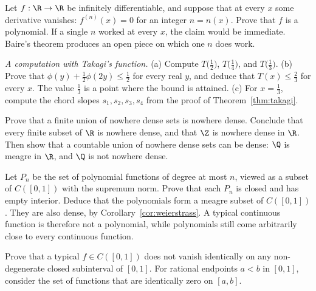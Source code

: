 \begin{exercise}[$\star\star\star$]\label{ex:polynomial}
Let $f:\R\to\R$ be infinitely differentiable, and suppose that at every $x$ some derivative vanishes: $f^{(n)}(x)=0$ for an integer $n=n(x)$. Prove that $f$ is a polynomial. If a single $n$ worked at every $x$, the claim would be immediate. Baire's theorem produces an open piece on which one $n$ does work.
\end{exercise}

\begin{exercise}[$\star$]\label{ex:takagivalues}
\emph{A computation with Takagi's function.} (a) Compute $T\bigl(\frac12\bigr)$, $T\bigl(\frac14\bigr)$, and $T\bigl(\frac13\bigr)$. (b) Prove that $\phi(y)+\frac12\phi(2y)\le\frac12$ for every real $y$, and deduce that $T(x)\le\frac23$ for every $x$. The value $\frac13$ is a point where the bound is attained. (c) For $x=\frac13$, compute the chord slopes $s_1,s_2,s_3,s_4$ from the proof of Theorem~\ref{thm:takagi}.
\end{exercise}

\begin{exercise}[$\star$]\label{ex:v7c05a}
Prove that a finite union of nowhere dense sets is nowhere dense. Conclude that every finite subset of $\R$ is nowhere dense, and that $\Z$ is nowhere dense in $\R$. Then show that a countable union of nowhere dense sets can be dense: $\Q$ is meagre in $\R$, and $\Q$ is not nowhere dense.
\end{exercise}

\begin{exercise}[$\star\star$]\label{ex:v7c05b}
Let $P_n$ be the set of polynomial functions of degree at most $n$, viewed as a subset of $C([0,1])$ with the supremum norm. Prove that each $P_n$ is closed and has empty interior. Deduce that the polynomials form a meagre subset of $C([0,1])$. They are also dense, by Corollary~\ref{cor:weierstrass}. A typical continuous function is therefore not a polynomial, while polynomials still come arbitrarily close to every continuous function.
\end{exercise}

\begin{exercise}[$\star\star$]\label{ex:v7c05c}
Prove that a typical $f\in C([0,1])$ does not vanish identically on any non-degenerate closed subinterval of $[0,1]$. For rational endpoints $a<b$ in $[0,1]$, consider the set of functions that are identically zero on $[a,b]$.
\end{exercise}

